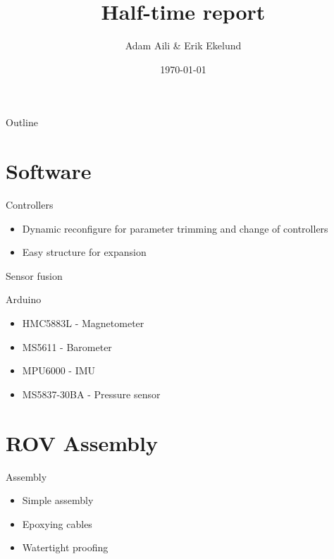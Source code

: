 \documentclass[11pt]{beamer}
\author{Adam Aili \& Erik Ekelund}
\title{Half-time report}
\date{\today}
\begin{document}
\begin{frame}
\titlepage
\end{frame}

\begin{frame}{Outline}
\tableofcontents
\end{frame}
\section{Software}
\begin{frame}{Controllers}
\begin{itemize}
\item Dynamic reconfigure for parameter trimming and change of controllers
\item Easy structure for expansion
\end{itemize}
\end{frame}

\begin{frame}{Sensor fusion}
\end{frame}

\begin{frame}{Arduino}
\begin{itemize}
\item HMC5883L - Magnetometer
\item MS5611 - Barometer
\item MPU6000 - IMU
\item MS5837-30BA - Pressure sensor
\end{itemize}
\end{frame}
\section{ROV Assembly}
\begin{frame}{Assembly}
\begin{itemize}
\item Simple assembly
\item Epoxying cables
\item Watertight proofing
\end{itemize}
\end{frame}
\end{document}
